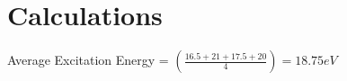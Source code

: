 \section{Calculations}

	

	\noindent Average Excitation Energy = $\left( \frac{16.5 + 21 + 17.5 + 20}{4} \right) = 18.75 eV$
